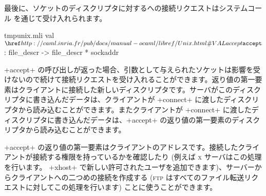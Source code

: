 最後に、ソケットのディスクリプタに対するへの接続リクエストはシステムコール  を通じて受け入れられます。
%
\begin{listingcodefile}{tmpunix.mli}
val $\libvalue{Unix}{accept}$ : file_descr -> file_descr * sockaddr
\end{listingcodefile}
%
\ml+accept+ の呼び出しが返った場合、引数として与えられたソケットは影響を受けないので続けて接続リクエストを受け入れることができます。返り値の第一要素はクライアントに接続した新しいディスクリプタです。サーバがこのディスクリプタに書き込んだデータは、クライアントが \ml+connect+ に渡したディスクリプタから読み込むことができます。またクライアントが \ml+connect+ に渡したディスクリプタに書き込んだデータは、\ml+accept+ の返り値の第一要素のディスクリプタから読み込むことができます。

\ml+accept+ の返り値の第一要素はクライアントのアドレスです。接続したクライアントが接続する権限を持っているかを確認したり (例えば \textsc{x} サーバはこの処理を行います。 \ml+xhost+ で新しい許可されたユーザを追加できます)、サーバーからクライアントへの二つめの接続を作成する (\textsc{ftp} はすべてのファイル転送リクエストに対してこの処理を行います) ことに使うことができます。

